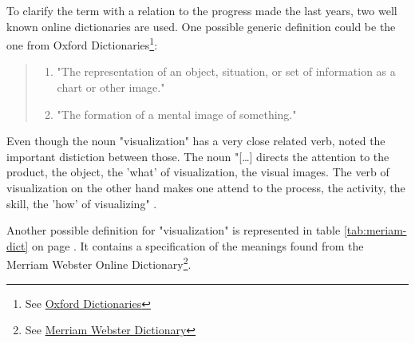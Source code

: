 To clarify the term with a relation to the progress made the last years, two well known online dictionaries are used. One possible generic definition could be the one from Oxford Dictionaries\footnote{See \href{https://www.oxforddictionaries.com/definition/english/visualization}{Oxford Dictionaries}}:

\begin{quote}
\begin{enumerate}
\item "The representation of an object, situation, or set of information as a chart or other image."
\item "The formation of a mental image of something."
\end{enumerate}
\end{quote}

Even though the noun "visualization" has a very close related verb, \citeauthor{Phillips2010} noted the important distiction between those. The noun "[\ldots] directs the attention to the product, the object, the 'what' of visualization, the visual images. The verb of visualization on the other hand makes one attend to the process, the activity, the skill, the 'how' of visualizing" .

Another possible definition for "visualization" is represented in table \ref{tab:meriam-dict} on page \pageref{tab:meriam-dict}. It contains a specification of the meanings found from the Merriam Webster Online Dictionary\footnote{\label{mod}See \href{http://www.merriam-webster.com/}{Merriam Webster Dictionary}}.

